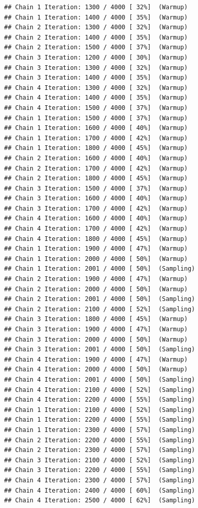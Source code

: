 \documentclass[
]{article}
\begin{document}
\begin{verbatim}
## Chain 1 Iteration: 1300 / 4000 [ 32%]  (Warmup) 
## Chain 1 Iteration: 1400 / 4000 [ 35%]  (Warmup) 
## Chain 2 Iteration: 1300 / 4000 [ 32%]  (Warmup) 
## Chain 2 Iteration: 1400 / 4000 [ 35%]  (Warmup) 
## Chain 2 Iteration: 1500 / 4000 [ 37%]  (Warmup) 
## Chain 3 Iteration: 1200 / 4000 [ 30%]  (Warmup) 
## Chain 3 Iteration: 1300 / 4000 [ 32%]  (Warmup) 
## Chain 3 Iteration: 1400 / 4000 [ 35%]  (Warmup) 
## Chain 4 Iteration: 1300 / 4000 [ 32%]  (Warmup) 
## Chain 4 Iteration: 1400 / 4000 [ 35%]  (Warmup) 
## Chain 4 Iteration: 1500 / 4000 [ 37%]  (Warmup) 
## Chain 1 Iteration: 1500 / 4000 [ 37%]  (Warmup) 
## Chain 1 Iteration: 1600 / 4000 [ 40%]  (Warmup) 
## Chain 1 Iteration: 1700 / 4000 [ 42%]  (Warmup) 
## Chain 1 Iteration: 1800 / 4000 [ 45%]  (Warmup) 
## Chain 2 Iteration: 1600 / 4000 [ 40%]  (Warmup) 
## Chain 2 Iteration: 1700 / 4000 [ 42%]  (Warmup) 
## Chain 2 Iteration: 1800 / 4000 [ 45%]  (Warmup) 
## Chain 3 Iteration: 1500 / 4000 [ 37%]  (Warmup) 
## Chain 3 Iteration: 1600 / 4000 [ 40%]  (Warmup) 
## Chain 3 Iteration: 1700 / 4000 [ 42%]  (Warmup) 
## Chain 4 Iteration: 1600 / 4000 [ 40%]  (Warmup) 
## Chain 4 Iteration: 1700 / 4000 [ 42%]  (Warmup) 
## Chain 4 Iteration: 1800 / 4000 [ 45%]  (Warmup) 
## Chain 1 Iteration: 1900 / 4000 [ 47%]  (Warmup) 
## Chain 1 Iteration: 2000 / 4000 [ 50%]  (Warmup) 
## Chain 1 Iteration: 2001 / 4000 [ 50%]  (Sampling) 
## Chain 2 Iteration: 1900 / 4000 [ 47%]  (Warmup) 
## Chain 2 Iteration: 2000 / 4000 [ 50%]  (Warmup) 
## Chain 2 Iteration: 2001 / 4000 [ 50%]  (Sampling) 
## Chain 2 Iteration: 2100 / 4000 [ 52%]  (Sampling) 
## Chain 3 Iteration: 1800 / 4000 [ 45%]  (Warmup) 
## Chain 3 Iteration: 1900 / 4000 [ 47%]  (Warmup) 
## Chain 3 Iteration: 2000 / 4000 [ 50%]  (Warmup) 
## Chain 3 Iteration: 2001 / 4000 [ 50%]  (Sampling) 
## Chain 4 Iteration: 1900 / 4000 [ 47%]  (Warmup) 
## Chain 4 Iteration: 2000 / 4000 [ 50%]  (Warmup) 
## Chain 4 Iteration: 2001 / 4000 [ 50%]  (Sampling) 
## Chain 4 Iteration: 2100 / 4000 [ 52%]  (Sampling) 
## Chain 4 Iteration: 2200 / 4000 [ 55%]  (Sampling) 
## Chain 1 Iteration: 2100 / 4000 [ 52%]  (Sampling) 
## Chain 1 Iteration: 2200 / 4000 [ 55%]  (Sampling) 
## Chain 1 Iteration: 2300 / 4000 [ 57%]  (Sampling) 
## Chain 2 Iteration: 2200 / 4000 [ 55%]  (Sampling) 
## Chain 2 Iteration: 2300 / 4000 [ 57%]  (Sampling) 
## Chain 3 Iteration: 2100 / 4000 [ 52%]  (Sampling) 
## Chain 3 Iteration: 2200 / 4000 [ 55%]  (Sampling) 
## Chain 4 Iteration: 2300 / 4000 [ 57%]  (Sampling) 
## Chain 4 Iteration: 2400 / 4000 [ 60%]  (Sampling) 
## Chain 4 Iteration: 2500 / 4000 [ 62%]  (Sampling) 

\end{verbatim}
\end{document}
